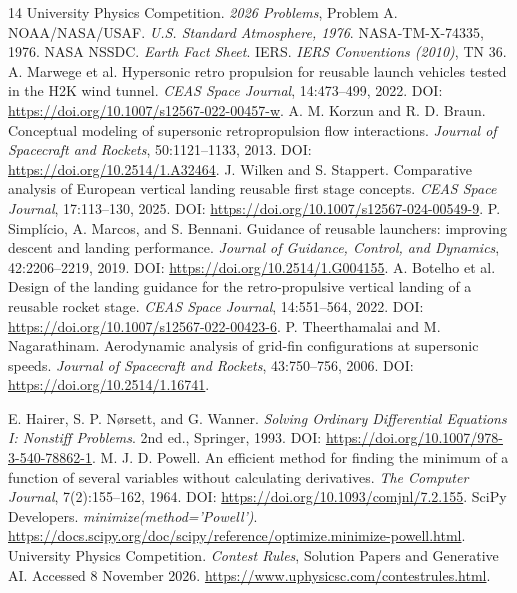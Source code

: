 \documentclass[11pt,a4paper]{article}
\begin{document}
\clearpage


\clearpage
{}
{}
\begin{thebibliography}{14}
\small
{} University Physics Competition. \emph{2026 Problems}, Problem A.
 NOAA/NASA/USAF. \emph{U.S. Standard Atmosphere, 1976}. NASA-TM-X-74335, 1976.
 NASA NSSDC. \emph{Earth Fact Sheet}.
 IERS. \emph{IERS Conventions (2010)}, TN 36.
 A. Marwege et al. Hypersonic retro propulsion for reusable launch vehicles tested in the H2K wind tunnel. \emph{CEAS Space Journal}, 14:473--499, 2022. DOI: \url{https://doi.org/10.1007/s12567-022-00457-w}.
 A. M. Korzun and R. D. Braun. Conceptual modeling of supersonic retropropulsion flow interactions. \emph{Journal of Spacecraft and Rockets}, 50:1121--1133, 2013. DOI: \url{https://doi.org/10.2514/1.A32464}.
 J. Wilken and S. Stappert. Comparative analysis of European vertical landing reusable first stage concepts. \emph{CEAS Space Journal}, 17:113--130, 2025. DOI: \url{https://doi.org/10.1007/s12567-024-00549-9}.
 P. Simpl\'{i}cio, A. Marcos, and S. Bennani. Guidance of reusable launchers: improving descent and landing performance. \emph{Journal of Guidance, Control, and Dynamics}, 42:2206--2219, 2019. DOI: \url{https://doi.org/10.2514/1.G004155}.
 A. Botelho et al. Design of the landing guidance for the retro-propulsive vertical landing of a reusable rocket stage. \emph{CEAS Space Journal}, 14:551--564, 2022. DOI: \url{https://doi.org/10.1007/s12567-022-00423-6}.
 P. Theerthamalai and M. Nagarathinam. Aerodynamic analysis of grid-fin configurations at supersonic speeds. \emph{Journal of Spacecraft and Rockets}, 43:750--756, 2006. DOI: \url{https://doi.org/10.2514/1.16741}.

 E. Hairer, S. P. N\o rsett, and G. Wanner. \emph{Solving Ordinary Differential Equations I: Nonstiff Problems}. 2nd ed., Springer, 1993. DOI: \url{https://doi.org/10.1007/978-3-540-78862-1}.
 M. J. D. Powell. An efficient method for finding the minimum of a function of several variables without calculating derivatives. \emph{The Computer Journal}, 7(2):155--162, 1964. DOI: \url{https://doi.org/10.1093/comjnl/7.2.155}.
 SciPy Developers. \emph{minimize(method='Powell')}. \url{https://docs.scipy.org/doc/scipy/reference/optimize.minimize-powell.html}.
 University Physics Competition. \emph{Contest Rules}, Solution Papers and Generative AI. Accessed 8 November 2026. \url{https://www.uphysicsc.com/contestrules.html}.

\end{thebibliography}
\end{document}
